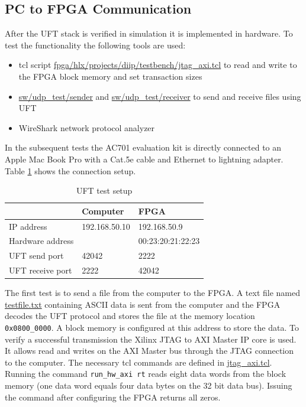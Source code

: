 %
%
\clearpage
\subsection{PC to FPGA Communication}
After the UFT stack is verified in simulation it is implemented in hardware. To
test the functionality the following tools are used:
\begin{itemize}
    \item tcl script \url{fpga/hlx/projects/diip/testbench/jtag_axi.tcl} to read
    and write to the FPGA block memory and set transaction sizes
    \item \url{sw/udp_test/sender} and \url{sw/udp_test/receiver} to send and
    receive files using UFT
    \item WireShark network protocol analyzer \cite{wireshark}
\end{itemize}

In the subsequent tests the AC701 evaluation kit is directly connected to an
Apple Mac Book Pro with a Cat.5e cable and Ethernet to lightning adapter. Table
\ref{tab:ufttestconf} shows the connection setup.
\\
\begin{table}[b!]
    \centering
    \begin{tabular}{l l l}
        \toprule
        {} & Computer & FPGA \\
        \midrule
        IP address & 192.168.50.10 & 192.168.50.9 \\
        Hardware address & {} & 00:23:20:21:22:23 \\
        UFT send port & 42042 & 2222 \\
        UFT receive port & 2222 & 42042 \\ 
        \bottomrule
    \end{tabular}
    \caption{UFT test setup}
    \label{tab:ufttestconf}
\end{table}

The first test is to send a file from the computer to the FPGA. A text file
named \url{testfile.txt} containing ASCII data is sent from the computer and
the FPGA decodes the UFT protocol and stores the file at the memory location
\texttt{0x0800\_0000}. A block memory is configured at this address to store the
data. To verify a successful transmission the Xilinx JTAG to AXI Master IP core
is used. It allows read and writes on the AXI Master bus through the JTAG
connection to the computer. The necessary tcl commands are defined in 
\url{jtag_axi.tcl}. Running the command \texttt{run\_hw\_axi rt} reads eight
data words from the block memory (one data word equals four data bytes on the
32 bit data bus). Issuing the command after configuring the FPGA returns all
zeros.

